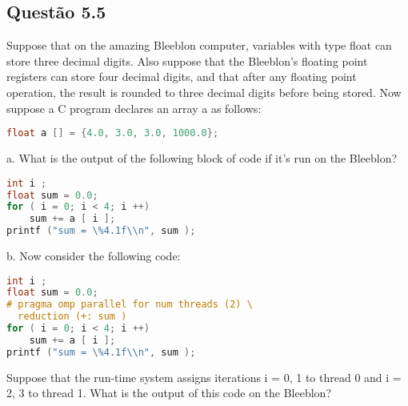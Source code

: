 
\subsection{Questão 5.5}

Suppose that on the amazing Bleeblon computer, variables with type float can store three decimal digits. Also suppose that the Bleeblon’s floating point registers can store four decimal digits, and that after any floating point operation, the result is rounded to three decimal digits before being stored. Now
suppose a C program declares an array a as follows:
\begin{lstlisting}[language=C]
float a [] = {4.0, 3.0, 3.0, 1000.0};
\end{lstlisting}

a. What is the output of the following block of code if it’s run on the Bleeblon?
\begin{lstlisting}[language=C]
int i ;
float sum = 0.0;
for ( i = 0; i < 4; i ++)
    sum += a [ i ];
printf ("sum = \%4.1f\\n", sum );
\end{lstlisting}


b. Now consider the following code:

\begin{lstlisting}[language=C]
int i ;
float sum = 0.0;
# pragma omp parallel for num threads (2) \
  reduction (+: sum )
for ( i = 0; i < 4; i ++)
    sum += a [ i ];
printf ("sum = \%4.1f\\n", sum );
\end{lstlisting}

Suppose that the run-time system assigns iterations i = 0, 1 to thread 0 and i = 2, 3 to thread 1. What is the output of this code on the Bleeblon?



